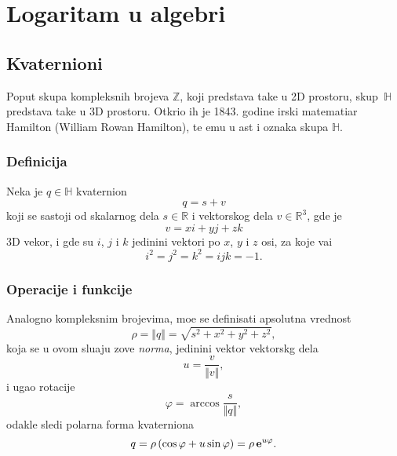 

\section{Logaritam u algebri}

\subsection{Kvaternioni}

\def\uv{{u}}
\def\vp{{\vec v}}
\def\norm#1{{\Vert#1\Vert}}

Poput skupa kompleksnih brojeva ${\mathbb Z}$, koji predstav{\lj}a ta{\cv}ke u 2D prostoru,
skup~${\mathbb H}$ predstav{\lj}a ta{\cv}ke u 3D prostoru. Otkrio ih je 
1843. godine irski matemati{\cv}ar
Hamilton (William Rowan Hamilton), te {\nj}emu u {\cv}ast i oznaka skupa ${\mathbb H}$.

\subsubsection{Definicija}

Neka je $q\in{\mathbb H}$ kvaternion
\begin{equation}
    q=s+v
\end{equation}
koji se sastoji od skalarnog dela $s\in{\mathbb R}$ i vektorskog dela $v\in{\mathbb R}^3$, gde je
\begin{equation}
    v=xi+yj+zk
\end{equation}
3D vekor, i gde su $i$, $j$ i $k$ jedini{\cv}ni vektori po $x$, $y$ i $z$ osi,
za koje va{\zv}i
\begin{equation}
    i^2=j^2=k^2=ijk=-1.
\end{equation}

\subsubsection{Operacije i funkcije}

Analogno kompleksnim brojevima, mo{\zv}e se definisati apsolutna vrednost
$$
\rho = \norm q = \sqrt{s^2+x^2+y^2+z^2},
$$
koja se u ovom slu{\cv}aju zove {\sl norma},
jedini{\cv}ni vektor vektorskg dela
$$
\uv = \frac v{\norm v},
$$
i ugao rotacije
$$
\varphi = \arccos \frac s{\norm q},
$$
odakle sledi polarna forma kvaterniona
\begin{equation}
    q
=\rho\,(\cos\varphi + \uv\sin\varphi)
=\rho\,\e^{\uv\varphi}.
\end{equation}

